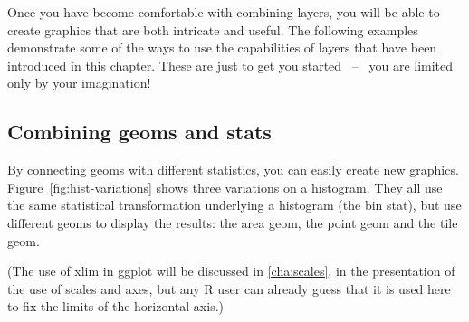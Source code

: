 Once you have become comfortable with combining layers, you will be able to create graphics that are both intricate and useful.  The following examples demonstrate some of the ways to use the capabilities of layers that have been introduced in this chapter.  These are just to get you started ~--~ you are limited only by your imagination!

\subsection{Combining geoms and stats}
\label{sub:new_plot_types}

By connecting geoms with different statistics, you can easily create new graphics.  Figure~\ref{fig:hist-variations} shows three variations on a histogram.  They all use the same statistical transformation underlying a histogram (the bin stat), but use different geoms to display the results: the area geom, the point geom and the tile geom.  

% 



(The use of xlim in ggplot will be discussed in \ref{cha:scales}, in the presentation of the use of scales and axes, but any R user can already guess that it is used here to fix the limits of the horizontal axis.)

% 


